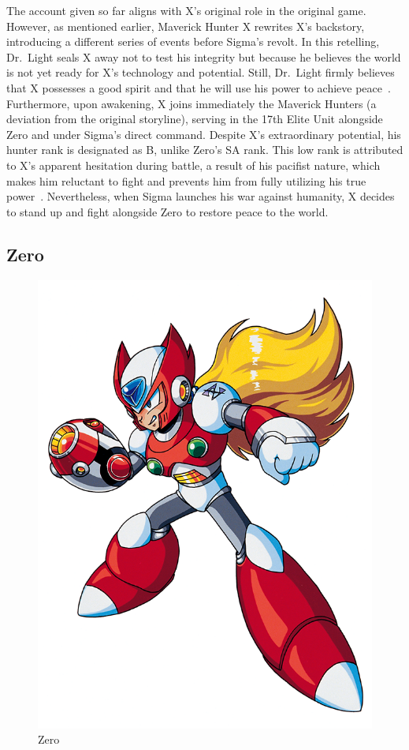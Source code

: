The account given so far aligns with X's original role in the original game. However, as mentioned earlier, Maverick Hunter X rewrites X's backstory, introducing a different series of events before Sigma's revolt. In this retelling, Dr.~Light seals X away not to test his integrity but because he believes the world is not yet ready for X's technology and potential. Still, Dr.~Light firmly believes that X possesses a good spirit and that he will use his power to achieve peace~\cite{wiki:MM_MHX_X}. Furthermore, upon awakening, X joins immediately the Maverick Hunters (a deviation from the original storyline), serving in the 17th Elite Unit alongside Zero and under Sigma's direct command. Despite X's extraordinary potential, his hunter rank is designated as B, unlike Zero's SA rank. This low rank is attributed to X's apparent hesitation during battle, a result of his pacifist nature, which makes him reluctant to fight and prevents him from fully utilizing his true power~\cite{Xcoll1:Manual_X1}. Nevertheless, when Sigma launches his war against humanity, X decides to stand up and fight alongside Zero to restore peace to the world.

\subsection{Zero}
\begin{figure}[htp]
	\centering
	\includegraphics[height=\portraitsize]{figures/X1/Zero_X1.png}
	\caption{Zero}
\end{figure}

